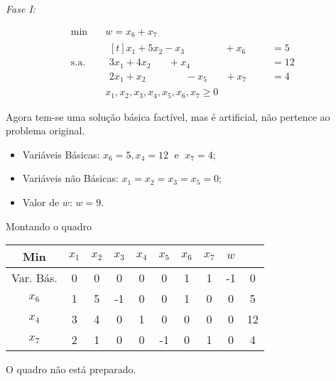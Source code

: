 \textit{Fase I:}

\begin{align*}
  \min        \quad & w = x_6 + x_7 \\
  \text{s.a.} \quad & 
                      \begin{aligned}[t]
                         x_1 + 5 x_2 - x_3 \phantom{+ x_4 - x_5} + x_6 \phantom{+ x_7} &= 5 \\
                       3 x_1 + 4 x_2 \phantom{- x_3} + x_4 \phantom{- x_5 + x_6 + x_7} &= 12 \\
                       2 x_1 +   x_2 \phantom{- x_3 + x_4} - x_5 \phantom{+ x_6} + x_7 &= 4
                      \end{aligned}\\
                    & x_1, x_2, x_3, x_4, x_5, x_6, x_7 \geq 0
\end{align*}

Agora tem-se uma solução básica factível, mas é artificial, não pertence ao 
problema original.
\begin{itemize}
  \item Variáveis Básicas: $ x_6 = 5, x_4 = 12\;\text{ e }\; x_7 = 4 $;
  \item Variáveis não Básicas: $ x_1 = x_2 = x_3 = x_5 = 0 $;
  \item Valor de $w$: $ w = 9 $.
\end{itemize}

\newpage

Montando o quadro

\begin{table}[!htbp]
  \centering
  \begin{tabular}{c|cccccccc|c}
    Min       & $x_1$ & $x_2$ & $x_3$ & $x_4$ & $x_5$ & $x_6$ & $x_7$ & $w$ &    \\ \hline 
    Var. Bás. & 0     & 0     & 0     & 0     & 0     & 1     & 1     & -1  & 0  \\ \hline
    $x_6$     & 1     & 5     & -1    & 0     & 0     & 1     & 0     & 0   & 5  \\
    $x_4$     & 3     & 4     & 0     & 1     & 0     & 0     & 0     & 0   & 12 \\
    $x_7$     & 2     & 1     & 0     & 0     & -1    & 0     & 1     & 0   & 4  
  \end{tabular}
\end{table}

O quadro não está preparado.

